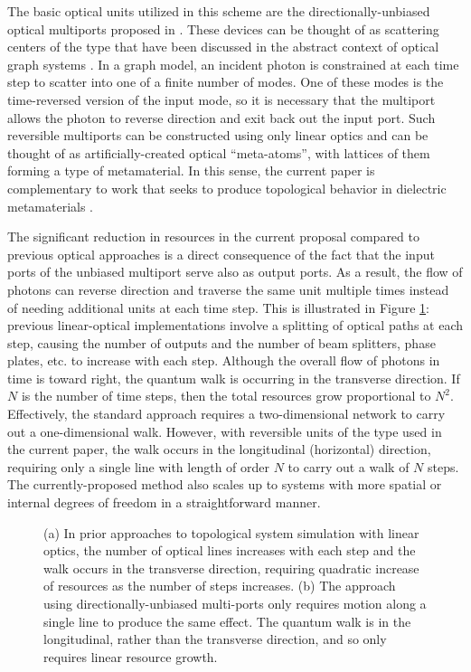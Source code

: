\documentclass[twocolumn,amsmath, amssymb, superscriptaddress, pra]{revtex4}
\begin{document}
The basic optical units utilized in this scheme are the directionally-unbiased optical multiports proposed in \cite{threeport}. These devices can be thought of
as scattering centers of the type that have been discussed in the abstract context of optical graph systems \cite{hbf,fh1,fh2,fh3}. In a graph model, an incident
photon is constrained at each time step to scatter into one of a finite number of modes. One of these modes is the time-reversed version of the input mode, so it
is necessary that the multiport allows the photon to reverse direction and exit back out the input port. Such reversible multiports can be constructed using only
linear optics and can be thought of as artificially-created optical ``meta-atoms'', with lattices of them forming a type of metamaterial. In this sense, the
current paper is complementary to work that seeks to produce topological behavior in dielectric metamaterials \cite{slob}.

The significant reduction in resources in the current proposal compared to previous optical approaches is a direct consequence of the fact that the input ports
of the unbiased multiport  serve also as output ports. As a result, the flow of photons can reverse direction and traverse the same unit multiple times instead
of needing additional units at each time step. This is illustrated in Figure \ref{explodefig}: previous linear-optical implementations involve a splitting of
optical paths at each step, causing the number of outputs and the number of beam splitters, phase plates, etc. to increase with each step. Although the overall
flow of photons in time is toward right, the quantum walk is occurring in the transverse direction. If $N$ is the number of time steps, then the total resources
grow proportional to $N^2$. Effectively, the standard approach requires a two-dimensional network to carry out a one-dimensional walk. However, with reversible
units of the type used in the current paper, the walk occurs in the longitudinal (horizontal) direction, requiring only a single line with length of order $N$ to
carry out a walk of $N$ steps.  The currently-proposed method also scales up to systems with more spatial or internal degrees of freedom in a straightforward
manner.

\begin{figure}
\begin{center}
\qquad  {}
\caption{(a) In prior approaches to topological system simulation with linear
optics, the number of optical lines increases with each step and the
walk occurs in the transverse direction, requiring
quadratic increase of resources as the number of steps increases.
(b) The approach using directionally-unbiased multi-ports only requires motion
along a single line to produce the same effect. The quantum walk is in the
longitudinal, rather than the transverse direction, and so only requires linear
resource growth.}\label{explodefig}
\end{center}
\end{figure}
\end{document}
